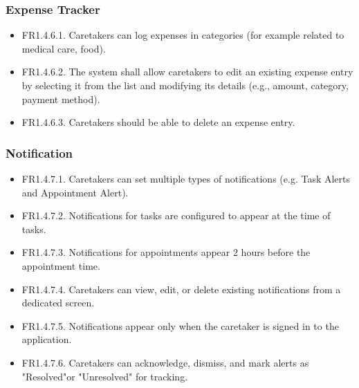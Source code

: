 \documentclass[12pt,a4paper]{article}
\begin{document}
\subsubsection{Expense Tracker}
\begin{itemize}
    \item FR1.4.6.1. Caretakers can log expenses in categories (for example related to medical care, food).
    \item FR1.4.6.2. The system shall allow caretakers to edit an existing expense entry by selecting it 
from the list and modifying its details (e.g., amount, category, payment method). 
    \item FR1.4.6.3. Caretakers should be able to delete an expense entry.
\end{itemize}

\subsubsection{Notification}
\begin{itemize}
    \item FR1.4.7.1.  Caretakers can set multiple types of notifications (e.g. Task Alerts and Appointment Alert). 
    \item FR1.4.7.2. Notifications for tasks are configured to appear at the time of tasks.
    \item FR1.4.7.3. Notifications for appointments appear 2 hours before the appointment time. 
    \item FR1.4.7.4. Caretakers can view, edit, or delete existing notifications from a dedicated screen. 
    \item FR1.4.7.5. Notifications appear only when the caretaker is signed in to the application.
    \item FR1.4.7.6. Caretakers can acknowledge, dismiss, and mark alerts as "Resolved"or "Unresolved" 
for tracking. 
\end{itemize}
\end{document}
